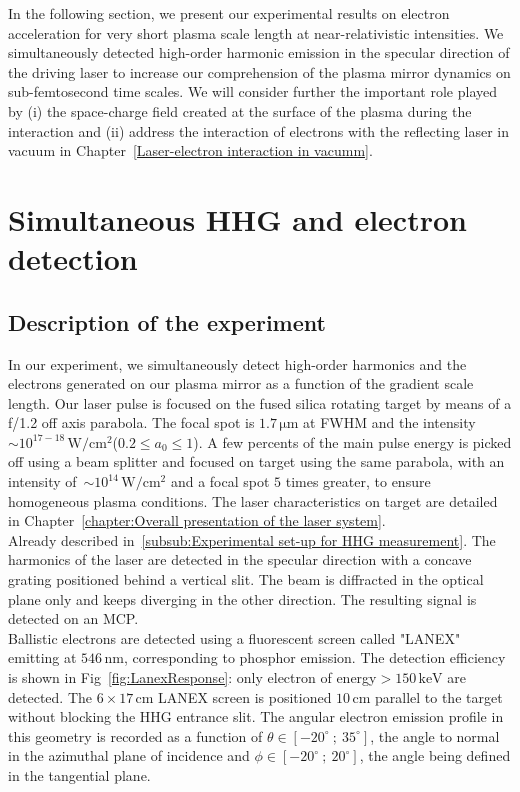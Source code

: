 \noindent In the following section, we present our experimental results  on electron acceleration for very short plasma scale length at near-relativistic intensities. We simultaneously detected high-order harmonic emission in the specular direction of the driving laser to increase our comprehension of the plasma mirror dynamics on sub-femtosecond time scales. We will consider further the important role played by (i) the space-charge field created at the surface of the plasma during the interaction and (ii) address the interaction of electrons with the reflecting laser in vacuum in Chapter~\ref{Laser-electron interaction in vacumm}.

\section{Simultaneous HHG and electron detection}\label{section:Simultaneous HHG and electron detection}

\subsection{Description of the experiment}

In our experiment, we simultaneously detect high-order harmonics and the electrons generated on our plasma mirror as a function of the gradient scale length. Our laser pulse is focused on the fused silica rotating target by means of a f/1.2 off axis parabola. The focal spot is $1.7\,\mathrm{\mu m}$ at FWHM and the intensity $\sim 10^{17-18}\,\mathrm{W/cm^2}$($0.2 \le a_0 \le 1$).
A few percents of the main pulse energy is picked off using a beam splitter and focused on target using the same parabola, with an intensity of~$\sim10^{14}\,\mathrm{W/cm^2}$ and a focal spot $5$ times greater, to ensure homogeneous plasma conditions. The laser characteristics on target are detailed in Chapter~\ref{chapter:Overall presentation of the laser system}.\\

\noindent {} Already described in~\ref{subsub:Experimental set-up for HHG measurement}. The harmonics of the laser are detected in the specular direction with a concave grating positioned behind a vertical slit.
 The beam is diffracted in the optical plane only and keeps diverging in the other direction. The resulting signal is detected on an MCP.  \\

\noindent {} Ballistic electrons are detected using a fluorescent screen called "LANEX" emitting at $546\,\mathrm{nm}$, corresponding to phosphor emission. The detection efficiency is shown in Fig~\ref{fig:LanexResponse}: only electron of energy$>150\,\mathrm{keV}$ are detected. The $6\times 17\,\mathrm{cm}$ LANEX screen is positioned $10\,\mathrm{cm}$ parallel to the target without blocking the HHG entrance slit. The angular electron emission profile in this geometry is recorded as a function of $\theta \in [-20^{\circ}\ ; \ 35^{\circ}]$, the angle to normal in the azimuthal plane of incidence and $\phi\in [-20^{\circ} \ ; \ 20^{\circ}]$, the angle being defined in the tangential plane.


